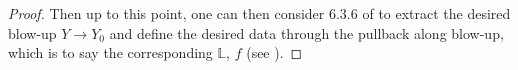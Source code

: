 \documentclass[12pt]{amsart}
\theoremstyle{definition}
\numberwithin{equation}{section}
\begin{document}
\begin{proof}
\indent Then up to this point, one can then consider 6.3.6 of \cite{KPX} to extract the desired blow-up $Y\rightarrow Y_0$ and define the desired data through the pullback along blow-up, which is to say the corresponding $\mathbb{L}$, $f$ (see \cite[Theorem 6.3.9]{KPX}). 

\end{proof}
\end{document}
